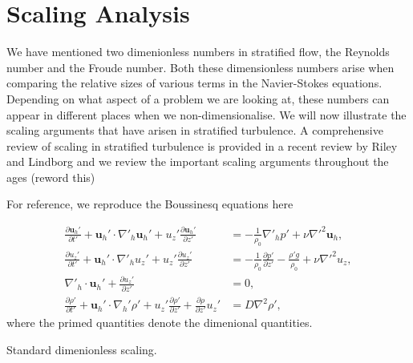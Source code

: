 \section{Scaling Analysis}
We have mentioned two dimenionless numbers in stratified flow, the Reynolds number and the Froude number. Both these dimensionless numbers arise when comparing the relative sizes of various terms in the Navier-Stokes equations. Depending on what aspect of a problem we are looking at, these numbers can appear in different places when we non-dimensionalise. We will now illustrate the scaling arguments that have arisen in stratified turbulence. A comprehensive review of scaling in stratified turbulence is provided in a recent review by Riley and Lindborg and we review the important scaling arguments throughout the ages (reword this)

For reference, we reproduce the Boussinesq equations here

\begin{align}
\frac{\partial \textbf{u}_{h}'}{\partial t'} + \textbf{u}_{h}'\cdot\nabla'_{h}\textbf{u}_{h}'+u_{z}'\frac{\partial \textbf{u}_{h}'}{\partial z'} &= -\frac{1}{\rho_{0}}\nabla'_{h}p' + \nu \nabla'^{2}\textbf{u}_{h}\label{scaling_horz},\\
\frac{\partial u_{z}'}{\partial t'} + \textbf{u}_{h}'\cdot\nabla'_{h}u_{z}'+u_{z}'\frac{\partial u_{z}'}{\partial z'} &= -\frac{1}{\rho_{0}}\frac{\partial p'}{\partial z'} - \frac{\rho' g}{\rho_{0}} + \nu \nabla'^{2}u_{z},\label{scaling_vert}\\
\nabla'_{h}\cdot\textbf{u}_{h}' + \frac{\partial u_{z}'}{\partial z'} &=0,\label{scaling_cont}\\
\frac{\partial \rho'}{\partial t'} + \textbf{u}_{h}'\cdot\nabla_{h}'\rho' + u_{z}'\frac{\partial \rho'}{\partial z'} + \frac{\partial \rho}{\partial z'}u_{z}'&=D\nabla^{2}\rho ',\label{scaling_moment}
\end{align}
where the primed quantities denote the dimenional quantities. 

Standard dimenionless scaling.
